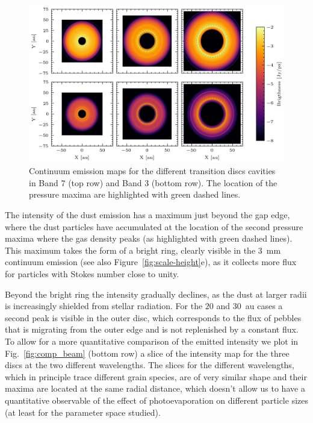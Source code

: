 \documentclass[fleqn,usenatbib]{mnras}
\begin{document}
        \begin{figure}
            \centering
            \includegraphics[width=\textwidth]{Fig4}
            \caption{Continuum emission maps for the different transition discs cavities in Band 7 (top row) and Band 3 (bottom row). The location of the pressure maxima are highlighted with green dashed lines.}
            \label{fig:DustContinuum}
        \end{figure}
        
        The intensity of the dust emission has a maximum just beyond the gap edge, where the dust particles have accumulated at the location of the second pressure maxima where the gas density peaks (as highlighted with green dashed lines). This maximum takes the form of a bright ring, clearly visible in the \SI{3}{mm} continuum emission (see also Figure~\ref{fig:scale-height}e), as it collects more flux for particles with Stokes number close to unity.
        
        Beyond the bright ring the intensity gradually declines, as the dust at larger radii is increasingly shielded from stellar radiation. For the $20$ and \SI{30}{au} cases a second peak is visible in the outer disc, which corresponds to the flux of pebbles that is migrating from the outer edge and is not replenished by a constant flux.
        To allow for a more quantitative comparison of the emitted intensity we plot in Fig.~\ref{fig:comp_beam} (bottom row) a slice of the intensity map for the three discs at the two different wavelengths.
        The slices for the different wavelengths, which in principle trace different grain species, are of very similar shape and their maxima are located at the same radial distance, which doesn't allow us to have a quantitative observable of the effect of photoevaporation on different particle sizes (at least for the parameter space studied).
         
\end{document}

